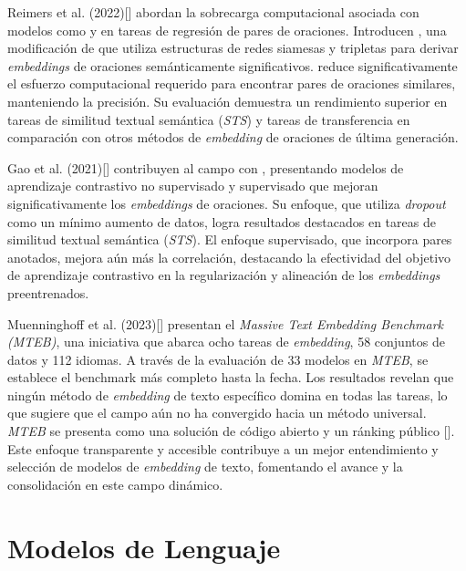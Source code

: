     Reimers et al. (2022)[\cite{reimers2019sentencebert}] abordan la sobrecarga computacional asociada con modelos como  y  en tareas de regresión de pares de oraciones. Introducen , una modificación de  que utiliza estructuras de redes siamesas y tripletas para derivar \emph{embeddings} de oraciones semánticamente significativos.  reduce significativamente el esfuerzo computacional requerido para encontrar pares de oraciones similares, manteniendo la precisión. Su evaluación demuestra un rendimiento superior en tareas de similitud textual semántica (\emph{STS}) y tareas de transferencia en comparación con otros métodos de \emph{embedding} de oraciones de última generación.

    Gao et al. (2021)[\cite{gao2022simcse}] contribuyen al campo con , presentando modelos de aprendizaje contrastivo no supervisado y supervisado que mejoran significativamente los \emph{embeddings} de oraciones. Su enfoque, que utiliza \emph{dropout} como un mínimo aumento de datos, logra resultados destacados en tareas de similitud textual semántica (\emph{STS}). El enfoque supervisado, que incorpora pares anotados, mejora aún más la correlación, destacando la efectividad del objetivo de aprendizaje contrastivo en la regularización y alineación de los \emph{embeddings} preentrenados.

    Muenninghoff et al. (2023)[\cite{muennighoff2023mteb}] presentan el \emph{Massive Text Embedding Benchmark (MTEB)}, una iniciativa que abarca ocho tareas de \emph{embedding}, 58 conjuntos de datos y 112 idiomas. A través de la evaluación de 33 modelos en \emph{MTEB}, se establece el benchmark más completo hasta la fecha. Los resultados revelan que ningún método de \emph{embedding} de texto específico domina en todas las tareas, lo que sugiere que el campo aún no ha convergido hacia un método universal. \emph{MTEB} se presenta como una solución de código abierto y un ránking público [\cite{leaderboard}]. Este enfoque transparente y accesible contribuye a un mejor entendimiento y selección de modelos de \emph{embedding} de texto, fomentando el avance y la consolidación en este campo dinámico.

\section{Modelos de Lenguaje}
   
